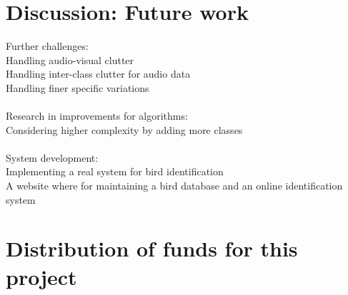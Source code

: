 \documentclass{article}
\begin{document}


\section{Discussion: Future work}

Further challenges:\\
Handling audio-visual clutter\\
Handling inter-class clutter for audio data\\
Handling finer specific variations \ \\ \ \\
Research in improvements for algorithms:\\
Considering higher complexity by adding more classes \ \\ \ \\
System development:\\
Implementing a real system for bird identification\\
A website where for maintaining a bird database and an online identification system\\

\section{Distribution of funds for this project}
\end{document}
